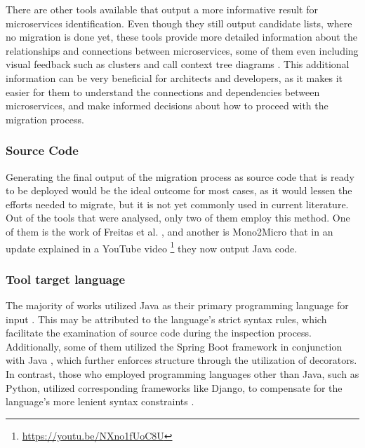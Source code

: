 \documentclass[conference]{IEEEtran}
\begin{document}
There are other tools available that output a more informative result for
microservices identification. Even though they still output candidate lists,
where no migration is done yet, these tools provide more detailed information
about the relationships and connections between microservices, some of them
even including visual feedback such as clusters and call context tree diagrams
. This additional information can be very beneficial
for architects and developers, as it makes it easier for them to understand the
connections and dependencies between microservices, and make informed decisions
about how to proceed with the migration process.

\subsubsection*{Source Code}

Generating the final output of the migration process as source code that is
ready to be deployed would be the ideal outcome for most cases, as it would
lessen the efforts needed to migrate, but it is not yet commonly used in
current literature. Out of the tools that were analysed, only two of them
employ this method. One of them is the work of Freitas et al.
, and another is Mono2Micro
 that in an update explained in a YouTube video
\footnote{\url{https://youtu.be/NXno1fUoC8U}} they now output Java code.

\subsubsection{Tool target language}

The majority of works utilized Java as their primary programming language for
input . This may be
attributed to the language's strict syntax rules, which facilitate the
examination of source code during the inspection process. Additionally, some of
them utilized the Spring Boot framework in conjunction with Java
, which
further enforces structure through the utilization of decorators. In contrast,
those who employed programming languages other than Java, such as Python,
utilized corresponding frameworks like Django, to compensate for the language's
more lenient syntax constraints .
\end{document}
